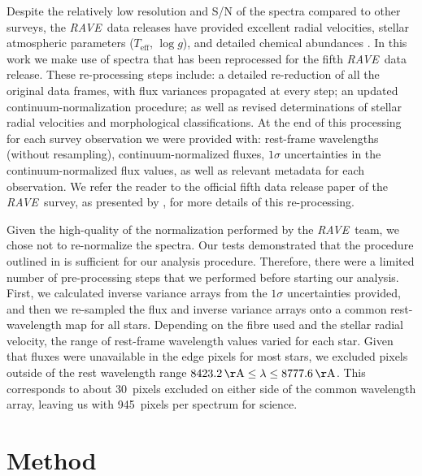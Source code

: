\documentclass[preprint]{aastex}
\newcommand{\acronym}[1]{{\small{#1}}}
\newcommand{\project}[1]{\textsl{#1}}
\newcommand{\rave}{\project{\acronym{RAVE}}}
\newcommand{\teff}{T_{\mathrm{eff}}}
\newcommand{\logg}{\log g}
\begin{document}
Despite the relatively low resolution and S/N of the spectra compared to other
surveys, the \rave\ data releases have provided excellent radial velocities, 
stellar atmospheric parameters ($\teff$, $\logg$), and detailed chemical abundances
\citep{Steinmetz_2006,Zwitter_2008,Siebert_2011,Boeche_2011,Kordopatis_2013,
Kunder_2016}.  In this work we make use of spectra that has been reprocessed for 
the fifth \rave\ data release.  These re-processing steps include: a detailed 
re-reduction of all the original data frames, with flux variances propagated at 
every step; an updated continuum-normalization procedure; as well as revised 
determinations of stellar radial velocities and morphological classifications. 
At the end of this processing for each survey observation we were provided with:
rest-frame wavelengths (without resampling), continuum-normalized fluxes, $1\sigma$
uncertainties in the continuum-normalized flux values, as well as relevant metadata
for each observation.  We refer the reader to the official fifth data release paper
of the \rave\ survey, as presented by \citet{Kunder_2016}, for more details of this
re-processing.


Given the high-quality of the normalization performed by the \rave\ team, we chose
not to re-normalize the spectra.  Our tests demonstrated that the procedure 
outlined in \citet{Kunder_2016} is sufficient for our analysis procedure. Therefore,
there were a limited number of pre-processing steps that we performed before starting
our analysis.  First, we calculated inverse variance arrays from the $1\sigma$ 
uncertainties provided, and then we re-sampled the flux and inverse variance
arrays onto a common rest-wavelength map for all stars.  Depending on the fibre 
used and the stellar radial velocity, the range of rest-frame wavelength values
varied for each star.  Given that fluxes were unavailable in the edge pixels for 
most stars, we excluded pixels outside of the rest wavelength range 
$8423.2\,{\rm \AA} \le \lambda \le 8777.6\,{\rm \AA}$.  This corresponds to about
30~pixels excluded on either side of the common wavelength array, leaving us with
945~pixels per spectrum for science.  


\section{Method}
\label{sec:method}
\end{document}
